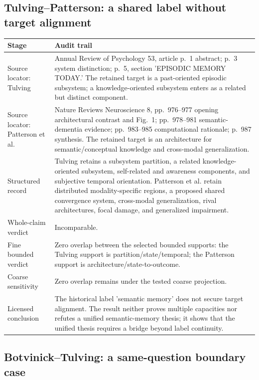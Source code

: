 \documentclass[11pt]{article}
\begin{document}
\subsection{Tulving--Patterson: a shared label without target alignment}

\begingroup
\small
\begin{tabularx}{\textwidth}{>{\raggedright\arraybackslash}p{} X}
\toprule
Stage & Audit trail \\
\midrule
Source locator: Tulving & Annual Review of Psychology 53, article p.~1 abstract; p.~3 system distinction; p.~5, section 'EPISODIC MEMORY TODAY.' The retained target is a past-oriented episodic subsystem; a knowledge-oriented subsystem enters as a related but distinct component. \\
Source locator: Patterson et al. & Nature Reviews Neuroscience 8, pp.~976--977 opening architectural contrast and Fig.~1; pp.~978--981 semantic-dementia evidence; pp.~983--985 computational rationale; p.~987 synthesis. The retained target is an architecture for semantic/conceptual knowledge and cross-modal generalization. \\
Structured record & Tulving retains a subsystem partition, a related knowledge-oriented subsystem, self-related and awareness components, and subjective temporal orientation. Patterson et al. retain distributed modality-specific regions, a proposed shared convergence system, cross-modal generalization, rival architectures, focal damage, and generalized impairment. \\
Whole-claim verdict & Incomparable. \\
Fine bounded verdict & Zero overlap between the selected bounded supports: the Tulving support is partition/state/temporal; the Patterson support is architecture/state-to-outcome. \\
Coarse sensitivity & Zero overlap remains under the tested coarse projection. \\
Licensed conclusion & The historical label 'semantic memory' does not secure target alignment. The result neither proves multiple capacities nor refutes a unified semantic-memory thesis; it shows that the unified thesis requires a bridge beyond label continuity. \\
\bottomrule
\end{tabularx}
\endgroup

\subsection{Botvinick--Tulving: a same-question boundary case}
\end{document}
